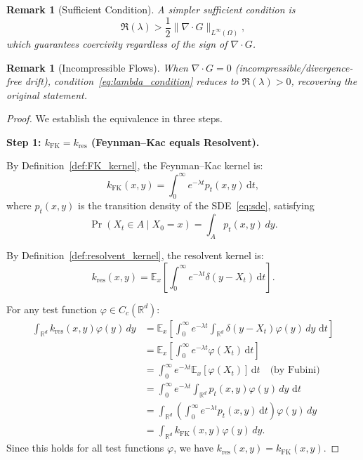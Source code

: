 \documentclass[11pt,a4paper]{article}
\newtheorem{remark}[theorem]{Remark}
\newcommand{\R}{\mathbb{R}}
\newcommand{\E}{\mathbb{E}}
\newcommand{\dt}{\,\mathrm{d}t}
\begin{document}
\begin{remark}[Sufficient Condition]
A simpler sufficient condition is
\begin{equation}\label{eq:lambda_sufficient}
\Re(\lambda) > \frac{1}{2}\|\nabla \cdot G\|_{L^\infty(\Omega)},
\end{equation}
which guarantees coercivity regardless of the sign of $\nabla \cdot G$.
\end{remark}

\begin{remark}[Incompressible Flows]
When $\nabla \cdot G = 0$ (incompressible/divergence-free drift), condition~\eqref{eq:lambda_condition} reduces to $\Re(\lambda) > 0$, recovering the original statement.
\end{remark}

\begin{proof}
We establish the equivalence in three steps.

\textbf{Step 1: $k_{\mathrm{FK}} = k_{\mathrm{res}}$ (Feynman--Kac equals Resolvent).}

By Definition~\ref{def:FK_kernel}, the Feynman--Kac kernel is:
\begin{equation}
k_{\mathrm{FK}}(x,y) = \int_0^\infty e^{-\lambda t} p_t(x,y) \dt,
\end{equation}
where $p_t(x,y)$ is the transition density of the SDE~\eqref{eq:sde}, satisfying
\begin{equation}
\Pr(X_t \in A \mid X_0 = x) = \int_A p_t(x,y) \, dy.
\end{equation}

By Definition~\ref{def:resolvent_kernel}, the resolvent kernel is:
\begin{equation}
k_{\mathrm{res}}(x,y) = \E_x\left[\int_0^\infty e^{-\lambda t} \delta(y - X_t) \dt\right].
\end{equation}

For any test function $\varphi \in C_c(\R^d)$:
\begin{align}
\int_{\R^d} k_{\mathrm{res}}(x,y) \varphi(y) \, dy &= \E_x\left[\int_0^\infty e^{-\lambda t} \int_{\R^d} \delta(y - X_t) \varphi(y) \, dy \, \dt\right] \\
&= \E_x\left[\int_0^\infty e^{-\lambda t} \varphi(X_t) \dt\right] \\
&= \int_0^\infty e^{-\lambda t} \E_x[\varphi(X_t)] \dt \quad \text{(by Fubini)} \\
&= \int_0^\infty e^{-\lambda t} \int_{\R^d} p_t(x,y) \varphi(y) \, dy \, \dt \\
&= \int_{\R^d} \left(\int_0^\infty e^{-\lambda t} p_t(x,y) \dt\right) \varphi(y) \, dy \\
&= \int_{\R^d} k_{\mathrm{FK}}(x,y) \varphi(y) \, dy.
\end{align}
Since this holds for all test functions $\varphi$, we have $k_{\mathrm{res}}(x,y) = k_{\mathrm{FK}}(x,y)$.


\end{proof}
\end{document}
